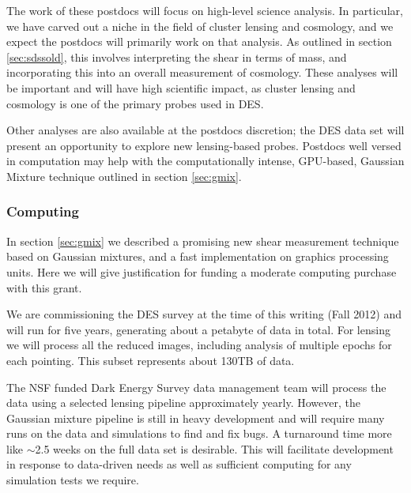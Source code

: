 \documentclass[12pt]{article}
\newcommand{\commissdate}{Fall 2012}
\begin{document}
The work of these postdocs will focus on high-level science analysis.  In
particular, we have carved out a niche in the field of cluster lensing and
cosmology, and we expect the postdocs will primarily work on that analysis.  As
outlined in section \ref{sec:sdssold}, this involves interpreting the shear in
terms of mass, and incorporating this into an overall measurement of cosmology.
These analyses will be important and will have high scientific impact, as
cluster lensing and cosmology is one of the primary probes used in DES.

Other analyses are also available at the postdocs discretion; the DES data set
will present an opportunity to explore new lensing-based probes.  Postdocs well
versed in computation may help with the computationally intense, GPU-based,
Gaussian Mixture technique outlined in section \ref{sec:gmix}.

\subsubsection{Computing} \label{sec:computing}

In section \ref{sec:gmix} we described a promising new shear measurement
technique based on Gaussian mixtures, and a fast implementation on graphics
processing units.  Here we will give justification for funding a moderate
computing purchase with this grant.

We are commissioning the DES survey at the time of this writing (\commissdate)
and will run for five years, generating about a petabyte of data in total.  For
lensing we will process all the reduced images, including analysis of multiple
epochs for each pointing.  This subset represents about 130TB of data.

The NSF funded Dark Energy Survey data management team will process the data
using a selected lensing pipeline approximately yearly.  However, the Gaussian
mixture pipeline is still in heavy development and will require many runs on
the data and simulations to find and fix bugs.  A turnaround time more like
$\sim$2.5 weeks on the full data set is desirable.   This will facilitate
development in response to data-driven needs as well as sufficient computing
for any simulation tests we require.

\end{document}
